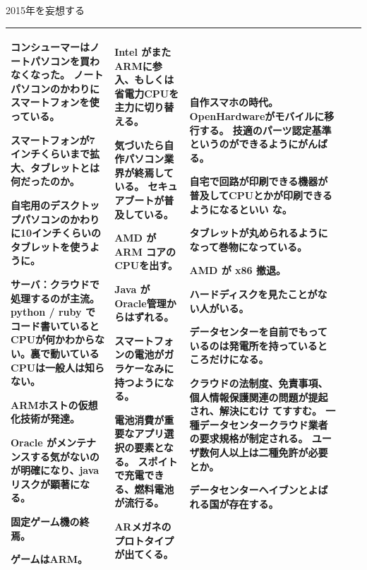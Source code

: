 \begin{frame}{2015年を妄想する}
{\begin{tabular}[t]{|p{8.5em}|p{12em}|p{8em}|p{6em}|p{8em}|}
コンシューマーはノートパソコンを買わなくなった。
ノートパソコンのかわりにスマートフォンを使っている。

スマートフォンが7インチくらいまで拡大、タブレットとは何だったのか。

自宅用のデスクトップパソコンのかわりに10インチくらいのタブレットを使うよ
	 うに。

サーバ：クラウドで処理するのが主流。python / ruby でコード書いていると
	 CPUが何かわからない。裏で動いているCPUは一般人は知らない。

ARMホストの仮想化技術が発達。

Oracle がメンテナンスする気がないのが明確になり、java リスクが顕著になる。

固定ゲーム機の終焉。

ゲームはARM。

 & 

Intel がまたARMに参入、もしくは省電力CPUを主力に切り替える。

気づいたら自作パソコン業界が終焉している。
セキュアブートが普及している。

AMD が ARM コアのCPUを出す。

Java が Oracle管理からはずれる。

スマートフォンの電池がガラケーなみに持つようになる。

電池消費が重要なアプリ選択の要素となる。
スポイトで充電できる、燃料電池が流行る。

ARメガネのプロトタイプが出てくる。

 & 

自作スマホの時代。
OpenHardwareがモバイルに移行する。
技適のパーツ認定基準というのができるようにがんばる。

自宅で回路が印刷できる機器が普及してCPUとかが印刷できるようになるといい
		 な。

タブレットが丸められるようになって巻物になっている。

AMD が x86 撤退。

ハードディスクを見たことがない人がいる。

データセンターを自前でもっているのは発電所を持っているところだけになる。

クラウドの法制度、免責事項、個人情報保護関連の問題が提起され、解決にむけ
		 てすすむ。
一種データセンタークラウド業者の要求規格が制定される。
ユーザ数何人以上は二種免許が必要とか。

データセンターヘイブンとよばれる国が存在する。


 \\

 \hline
 \end{tabular}

 }
\end{frame}


